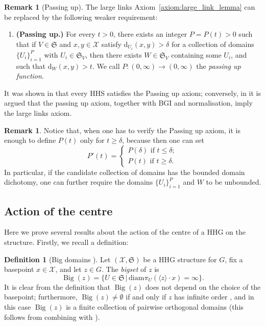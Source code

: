 \documentclass[svgnames]{amsart}
\theoremstyle{plain}
\theoremstyle{definition}
\newtheorem{defn}[thm]{Definition}
\newtheorem{rem}[thm]{Remark}
\newcommand{\cal}[1]{\mathcal{#1}}
\newcommand{\frakS}{\mathfrak{S}}
\newcommand{\Bigdom}[1]{\operatorname{Big}\left(#1\right)}
\newcommand{\diam}{\mathrm{diam}}
\newcommand{\dist}{\mathrm{d}}
\begin{document}
\begin{rem}[Passing up]\label{rem:passingup}
    The large links Axiom~\ref{axiom:large_link_lemma} can be replaced by the following weaker requirement:
    \begin{enumerate}[start=9, label=(\arabic*{}')]
        \item \textbf{(Passing up.)}\label{axiom:passingup} For every $t>0$, there exists an integer $P=P(t)>0$ such that if $V\in \frakS$ and $x,y\in \cal X$ satisfy $\dist_{U_i}(x,y)>\delta$ for a collection of domains $\{U_i\}_{i=1}^P$ with $U_i\in \frakS_V$, then there exists $W\in \frakS_V$ containing some $U_i$, and such that $\dist_W(x,y)>t$. We call $P\colon(0,\infty)\to (0,\infty)$ the \emph{passing up function}.
    \end{enumerate}
It was shown in \cite[Lemma~2.5]{HHS_II} that every HHS satisfies the Passing up axiom; conversely, in \cite[Section~4.8]{Durham_cubinf} it is argued that the passing up axiom, together with BGI and normalisation, imply the large links axiom. \end{rem}

\begin{rem}\label{rem:checking_passingup}
    Notice that, when one has to verify the Passing up axiom, it is enough to define $P(t)$ only for $t\ge \delta$, because then one can set
$$P'(t)=\begin{cases}
    P(\delta)\mbox{ if }t\le\delta;\\
    P(t)\mbox{ if }t\ge \delta.
\end{cases}$$
In particular, if the candidate collection of domains has the bounded domain dichotomy, one can further require the domains $\{U_i\}_{i=1}^P$ and $W$ to be unbounded.
\end{rem}



\subsection{Action of the centre}
Here we prove several results about the action of the centre of a HHG on the structure. Firstly, we recall a definition:

\begin{defn}[{Big domains \cite{DHS}}]
Let $(\cal X,\frakS)$ be a HHG structure for $G$, fix a basepoint $x\in \cal X$, and let $z\in G$. The \emph{bigset} of $z$ is 
    $$\Bigdom{z}=\{U\in \frakS\,|\,\diam\pi_U(\langle z\rangle\cdot  x)=\infty\}.$$
 It is clear from the definition that $\Bigdom{z}$ does not depend on the choice of the basepoint; furthermore, $\Bigdom{z}\neq \emptyset$ if and only if  $z$ has infinite order \cite[Proposition 6.4]{DHS}, and in this case $\Bigdom{z}$ is a finite collection of pairwise orthogonal domains (this follows from combining \cite[Lemma 6.7]{DHS} with \cite[Lemma 2.1]{HHS_II}). 
\end{defn}
\end{document}

